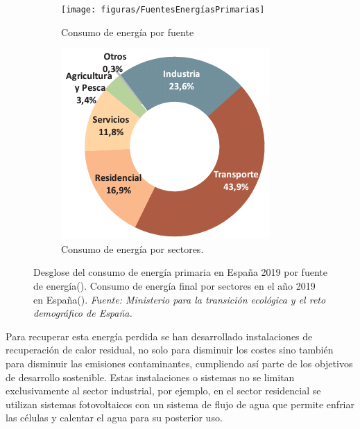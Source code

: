 \begin{figure}[H]
	\centering
	\begin{subfigure}[b]{0.48\textwidth}
		\texttt{[image: figuras/FuentesEnergíasPrimarias]}
		\caption{Consumo de energía por fuente}
		\label{fig:fuentesenergiasprimarias}
	\end{subfigure}
	\hfill
	\begin{subfigure}[b]{0.48\textwidth}
		\centering
		\includegraphics[width=\textwidth]{figuras/consumoEnergiaFinalPorSectores_2019}
		\caption{Consumo de energía por sectores.}
		\label{fig:consumoenergiafinalporsectores2019}
	\end{subfigure}
\caption[]{Desglose del consumo de energía primaria en España 2019 por fuente de energía(). Consumo de energía final por sectores en el año 2019 en España(). \textit{Fuente:  Ministerio para la transición ecológica y el reto demográfico de España.} }
 \label{fig:consumosEnergiasCategorias}
\end{figure}

Para recuperar esta energía perdida se han desarrollado instalaciones de recuperación de calor residual, no solo para disminuir los costes sino también para disminuir las emisiones contaminantes, cumpliendo así parte de los objetivos de desarrollo sostenible. Estas instalaciones o sistemas no se limitan exclusivamente al sector industrial, por ejemplo, en el sector residencial se utilizan sistemas fotovoltaicos con un sistema de flujo de agua que permite enfriar las células y calentar el agua para su posterior uso.\\ 

